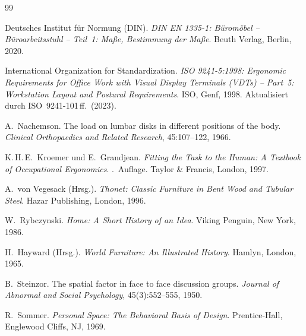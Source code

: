 \documentclass[a4paper,12pt]{article}
\theoremstyle{definition}
\begin{document}
\begin{thebibliography}{99}


Deutsches Institut f\"{u}r Normung (DIN).
\newblock \emph{DIN EN 1335-1: B\"{u}rom\"{o}bel -- B\"{u}roarbeitsstuhl --
  Teil~1: Ma\ss{}e, Bestimmung der Ma\ss{}e}.
\newblock Beuth Verlag, Berlin, 2020.

International Organization for Standardization.
\newblock \emph{ISO 9241-5:1998: Ergonomic Requirements for Office Work with
  Visual Display Terminals (VDTs) -- Part~5: Workstation Layout and Postural
  Requirements}.
\newblock ISO, Genf, 1998.
\newblock Aktualisiert durch ISO~9241-101\,ff.\ (2023).


A.~Nachemson.
\newblock The load on lumbar disks in different positions of the body.
\newblock \emph{Clinical Orthopaedics and Related Research}, 45:107--122,
  1966.

K.\,H.\,E.~Kroemer und E.~Grandjean.
\newblock \emph{Fitting the Task to the Human: A Textbook of Occupational
  Ergonomics}.
.\ Auflage. Taylor \& Francis, London, 1997.


A.~von Vegesack (Hrsg.).
\newblock \emph{Thonet: Classic Furniture in Bent Wood and Tubular Steel}.
\newblock Hazar Publishing, London, 1996.

W.~Rybczynski.
\newblock \emph{Home: A Short History of an Idea}.
\newblock Viking Penguin, New York, 1986.

H.~Hayward (Hrsg.).
\newblock \emph{World Furniture: An Illustrated History}.
\newblock Hamlyn, London, 1965.


B.~Steinzor.
\newblock The spatial factor in face to face discussion groups.
\newblock \emph{Journal of Abnormal and Social Psychology},
  45(3):552--555, 1950.

R.~Sommer.
\newblock \emph{Personal Space: The Behavioral Basis of Design}.
\newblock Prentice-Hall, Englewood Cliffs, NJ, 1969.



\end{thebibliography}
\end{document}
